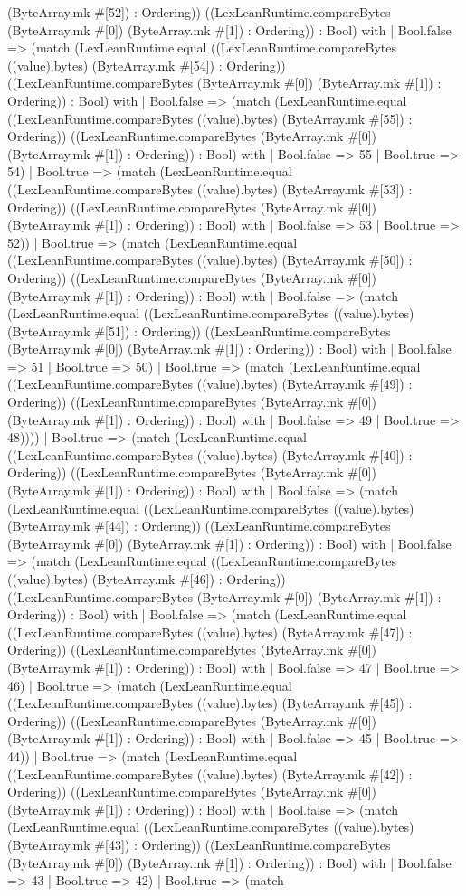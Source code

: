 \documentclass[11pt]{article}
\begin{document}
(ByteArray.mk \#[52]) : Ordering)) ((LexLeanRuntime.compareBytes (ByteArray.mk \#[0]) (ByteArray.mk \#[1]) : Ordering)) : Bool) with | Bool.false => (match (LexLeanRuntime.equal ((LexLeanRuntime.compareBytes ((value).bytes) (ByteArray.mk \#[54]) : Ordering)) ((LexLeanRuntime.compareBytes (ByteArray.mk \#[0]) (ByteArray.mk \#[1]) : Ordering)) : Bool) with | Bool.false => (match (LexLeanRuntime.equal ((LexLeanRuntime.compareBytes ((value).bytes) (ByteArray.mk \#[55]) : Ordering)) ((LexLeanRuntime.compareBytes (ByteArray.mk \#[0]) (ByteArray.mk \#[1]) : Ordering)) : Bool) with | Bool.false => 55 | Bool.true => 54) | Bool.true => (match (LexLeanRuntime.equal ((LexLeanRuntime.compareBytes ((value).bytes) (ByteArray.mk \#[53]) : Ordering)) ((LexLeanRuntime.compareBytes (ByteArray.mk \#[0]) (ByteArray.mk \#[1]) : Ordering)) : Bool) with | Bool.false => 53 | Bool.true => 52)) | Bool.true => (match (LexLeanRuntime.equal ((LexLeanRuntime.compareBytes ((value).bytes) (ByteArray.mk \#[50]) : Ordering)) ((LexLeanRuntime.compareBytes (ByteArray.mk \#[0]) (ByteArray.mk \#[1]) : Ordering)) : Bool) with | Bool.false => (match (LexLeanRuntime.equal ((LexLeanRuntime.compareBytes ((value).bytes) (ByteArray.mk \#[51]) : Ordering)) ((LexLeanRuntime.compareBytes (ByteArray.mk \#[0]) (ByteArray.mk \#[1]) : Ordering)) : Bool) with | Bool.false => 51 | Bool.true => 50) | Bool.true => (match (LexLeanRuntime.equal ((LexLeanRuntime.compareBytes ((value).bytes) (ByteArray.mk \#[49]) : Ordering)) ((LexLeanRuntime.compareBytes (ByteArray.mk \#[0]) (ByteArray.mk \#[1]) : Ordering)) : Bool) with | Bool.false => 49 | Bool.true => 48)))) | Bool.true => (match (LexLeanRuntime.equal ((LexLeanRuntime.compareBytes ((value).bytes) (ByteArray.mk \#[40]) : Ordering)) ((LexLeanRuntime.compareBytes (ByteArray.mk \#[0]) (ByteArray.mk \#[1]) : Ordering)) : Bool) with | Bool.false => (match (LexLeanRuntime.equal ((LexLeanRuntime.compareBytes ((value).bytes) (ByteArray.mk \#[44]) : Ordering)) ((LexLeanRuntime.compareBytes (ByteArray.mk \#[0]) (ByteArray.mk \#[1]) : Ordering)) : Bool) with | Bool.false => (match (LexLeanRuntime.equal ((LexLeanRuntime.compareBytes ((value).bytes) (ByteArray.mk \#[46]) : Ordering)) ((LexLeanRuntime.compareBytes (ByteArray.mk \#[0]) (ByteArray.mk \#[1]) : Ordering)) : Bool) with | Bool.false => (match (LexLeanRuntime.equal ((LexLeanRuntime.compareBytes ((value).bytes) (ByteArray.mk \#[47]) : Ordering)) ((LexLeanRuntime.compareBytes (ByteArray.mk \#[0]) (ByteArray.mk \#[1]) : Ordering)) : Bool) with | Bool.false => 47 | Bool.true => 46) | Bool.true => (match (LexLeanRuntime.equal ((LexLeanRuntime.compareBytes ((value).bytes) (ByteArray.mk \#[45]) : Ordering)) ((LexLeanRuntime.compareBytes (ByteArray.mk \#[0]) (ByteArray.mk \#[1]) : Ordering)) : Bool) with | Bool.false => 45 | Bool.true => 44)) | Bool.true => (match (LexLeanRuntime.equal ((LexLeanRuntime.compareBytes ((value).bytes) (ByteArray.mk \#[42]) : Ordering)) ((LexLeanRuntime.compareBytes (ByteArray.mk \#[0]) (ByteArray.mk \#[1]) : Ordering)) : Bool) with | Bool.false => (match (LexLeanRuntime.equal ((LexLeanRuntime.compareBytes ((value).bytes) (ByteArray.mk \#[43]) : Ordering)) ((LexLeanRuntime.compareBytes (ByteArray.mk \#[0]) (ByteArray.mk \#[1]) : Ordering)) : Bool) with | Bool.false => 43 | Bool.true => 42) | Bool.true => (match 
\end{document}
